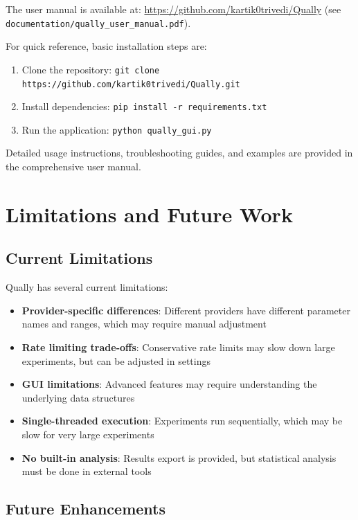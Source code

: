\documentclass[11pt,a4paper]{article}
\begin{document}
The user manual is available at: \url{https://github.com/kartik0trivedi/Qually} (see \texttt{documentation/qually\_user\_manual.pdf}).

For quick reference, basic installation steps are:
\begin{enumerate}
    \item Clone the repository: \texttt{git clone https://github.com/kartik0trivedi/Qually.git}
    \item Install dependencies: \texttt{pip install -r requirements.txt}
    \item Run the application: \texttt{python qually\_gui.py}
\end{enumerate}

Detailed usage instructions, troubleshooting guides, and examples are provided in the comprehensive user manual.

\section{Limitations and Future Work}
\label{sec:limitations}

\subsection{Current Limitations}

Qually has several current limitations:

\begin{itemize}
    \item \textbf{Provider-specific differences}: Different providers have different parameter names and ranges, which may require manual adjustment
    \item \textbf{Rate limiting trade-offs}: Conservative rate limits may slow down large experiments, but can be adjusted in settings
    \item \textbf{GUI limitations}: Advanced features may require understanding the underlying data structures
    \item \textbf{Single-threaded execution}: Experiments run sequentially, which may be slow for very large experiments
    \item \textbf{No built-in analysis}: Results export is provided, but statistical analysis must be done in external tools
\end{itemize}

\subsection{Future Enhancements}
\end{document}
